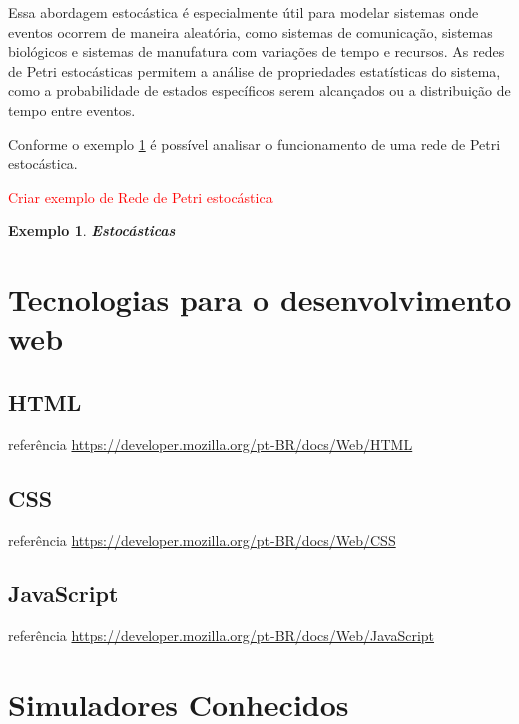 \documentclass[
	12pt,				%
	openright,			%
	oneside,			%
	a4paper,			%
	english,			%
	brazil				%
	]{abntex2}
\newtheorem{exemplo}{Exemplo}
\begin{document}
Essa abordagem estocástica é especialmente útil para modelar sistemas onde eventos ocorrem de maneira aleatória, como sistemas de comunicação, sistemas biológicos e sistemas de manufatura com variações de tempo e recursos. As redes de Petri estocásticas permitem a análise de propriedades estatísticas do sistema, como a probabilidade de estados específicos serem alcançados ou a distribuição de tempo entre eventos.

Conforme o exemplo \ref{exemplo_estocastica} é possível analisar o funcionamento de uma rede de Petri estocástica.

\textcolor{red}{Criar exemplo de Rede de Petri estocástica}

\begin{exemplo} \textbf{Estocásticas}
\label{exemplo_estocastica}

\end{exemplo}


\section{Tecnologias para o desenvolvimento web}

\subsection*{HTML}

referência \url{https://developer.mozilla.org/pt-BR/docs/Web/HTML}

\subsection*{CSS}

referência \url{https://developer.mozilla.org/pt-BR/docs/Web/CSS}

\subsection*{JavaScript}

referência \url{https://developer.mozilla.org/pt-BR/docs/Web/JavaScript}

\section{Simuladores Conhecidos}
\end{document}
